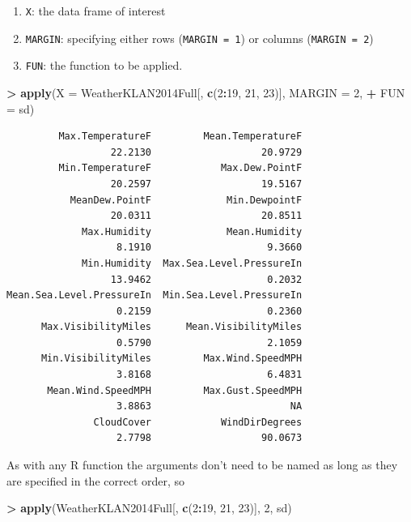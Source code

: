 \documentclass[]{krantz}
\makeatletter
\newenvironment{Shaded}{\begin{snugshade}}{\end{snugshade}}
\newcommand{\DataTypeTok}[1]{\textcolor[rgb]{0.27,0.27,0.27}{#1}}
\newcommand{\DecValTok}[1]{\textcolor[rgb]{0.06,0.06,0.06}{#1}}
\newcommand{\KeywordTok}[1]{\textcolor[rgb]{0.27,0.27,0.27}{\textbf{#1}}}
\newcommand{\NormalTok}[1]{#1}
\newcommand{\OperatorTok}[1]{\textcolor[rgb]{0.43,0.43,0.43}{\textbf{#1}}}
\newcommand{\StringTok}[1]{\textcolor[rgb]{0.5,0.5,0.5}{#1}}
\providecommand{\tightlist}{%
  \setlength{\itemsep}{0pt}\setlength{\parskip}{0pt}}
\newenvironment{kframe}{%
\medskip{}
\setlength{\fboxsep}{.8em}
 \def\at@end@of@kframe{}%
 \ifinner\ifhmode%
  \def\at@end@of@kframe{\end{minipage}}%
  \begin{minipage}{\columnwidth}%
 \fi\fi%
 \def\FrameCommand##1{\hskip\@totalleftmargin \hskip-\fboxsep
 \colorbox{shadecolor}{##1}\hskip-\fboxsep
     \hskip-\linewidth \hskip-\@totalleftmargin \hskip\columnwidth}%
 \MakeFramed {\advance\hsize-\width
   \@totalleftmargin\z@ \linewidth\hsize
   \@setminipage}}%
 {\par\unskip\endMakeFramed%
 \at@end@of@kframe}
\renewenvironment{Shaded}{\begin{kframe}}{\end{kframe}}
\makeatother
\begin{document}
\begin{enumerate}
\def\labelenumi{\arabic{enumi}.}
\tightlist
\item
  \texttt{X}: the data frame of interest
\item
  \texttt{MARGIN}: specifying either rows (\texttt{MARGIN\ =\ 1}) or columns (\texttt{MARGIN\ =\ 2})
\item
  \texttt{FUN}: the function to be applied.
\end{enumerate}

\begin{Shaded}
\begin{Highlighting}[]
\OperatorTok{>}\StringTok{ }\KeywordTok{apply}\NormalTok{(}\DataTypeTok{X =}\NormalTok{ WeatherKLAN2014Full[, }\KeywordTok{c}\NormalTok{(}\DecValTok{2}\OperatorTok{:}\DecValTok{19}\NormalTok{, }\DecValTok{21}\NormalTok{, }\DecValTok{23}\NormalTok{)], }\DataTypeTok{MARGIN =} \DecValTok{2}\NormalTok{, }
\OperatorTok{+}\StringTok{   }\DataTypeTok{FUN =}\NormalTok{ sd)}
\end{Highlighting}
\end{Shaded}

\begin{verbatim}
         Max.TemperatureF         Mean.TemperatureF 
                  22.2130                   20.9729 
         Min.TemperatureF            Max.Dew.PointF 
                  20.2597                   19.5167 
           MeanDew.PointF             Min.DewpointF 
                  20.0311                   20.8511 
             Max.Humidity             Mean.Humidity 
                   8.1910                    9.3660 
             Min.Humidity  Max.Sea.Level.PressureIn 
                  13.9462                    0.2032 
Mean.Sea.Level.PressureIn  Min.Sea.Level.PressureIn 
                   0.2159                    0.2360 
      Max.VisibilityMiles      Mean.VisibilityMiles 
                   0.5790                    2.1059 
      Min.VisibilityMiles         Max.Wind.SpeedMPH 
                   3.8168                    6.4831 
       Mean.Wind.SpeedMPH         Max.Gust.SpeedMPH 
                   3.8863                        NA 
               CloudCover            WindDirDegrees 
                   2.7798                   90.0673 
\end{verbatim}

As with any R function the arguments don't need to be named as long as they are specified in the correct order, so

\begin{Shaded}
\begin{Highlighting}[]
\OperatorTok{>}\StringTok{ }\KeywordTok{apply}\NormalTok{(WeatherKLAN2014Full[, }\KeywordTok{c}\NormalTok{(}\DecValTok{2}\OperatorTok{:}\DecValTok{19}\NormalTok{, }\DecValTok{21}\NormalTok{, }\DecValTok{23}\NormalTok{)], }\DecValTok{2}\NormalTok{, sd)}
\end{Highlighting}
\end{Shaded}
\end{document}
